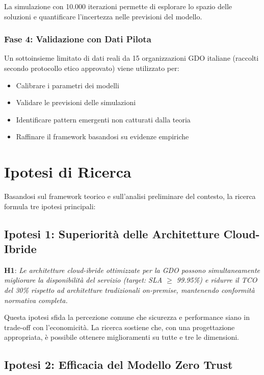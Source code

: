La simulazione con 10.000 iterazioni permette di esplorare lo spazio delle soluzioni e quantificare l'incertezza nelle previsioni del modello.

\subsubsection{Fase 4: Validazione con Dati Pilota}

Un sottoinsieme limitato di dati reali da 15 organizzazioni GDO italiane (raccolti secondo protocollo etico approvato) viene utilizzato per:
\begin{itemize}
\item Calibrare i parametri dei modelli
\item Validare le previsioni delle simulazioni
\item Identificare pattern emergenti non catturati dalla teoria
\item Raffinare il framework basandosi su evidenze empiriche
\end{itemize}

\section{Ipotesi di Ricerca}

Basandosi sul framework teorico e sull'analisi preliminare del contesto, la ricerca formula tre ipotesi principali:

\subsection{Ipotesi 1: Superiorità delle Architetture Cloud-Ibride}

\textbf{H1}: \textit{Le architetture cloud-ibride ottimizzate per la GDO possono simultaneamente migliorare la disponibilità del servizio (target: SLA $\geq$ 99.95\%) e ridurre il TCO del 30\% rispetto ad architetture tradizionali on-premise, mantenendo conformità normativa completa.}

Questa ipotesi sfida la percezione comune che sicurezza e performance siano in trade-off con l'economicità. La ricerca sostiene che, con una progettazione appropriata, è possibile ottenere miglioramenti su tutte e tre le dimensioni.

\subsection{Ipotesi 2: Efficacia del Modello Zero Trust}

